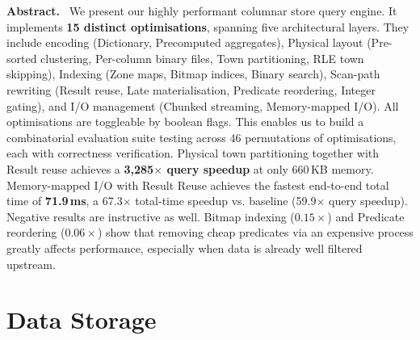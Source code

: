 \documentclass[11pt,a4paper]{article}
\begin{document}
\setcounter{page}{1}

\noindent\textbf{Abstract.}~%
We present our highly performant columnar store query engine.
It implements \textbf{15 distinct optimisations}, spanning five architectural layers.
They include encoding (Dictionary, Precomputed aggregates), Physical layout (Pre-sorted clustering, Per-column binary files, Town partitioning, RLE town skipping), Indexing (Zone maps, Bitmap indices, Binary search), Scan-path rewriting (Result reuse, Late materialisation, Predicate reordering, Integer gating), and I/O management (Chunked streaming, Memory-mapped I/O).
All optimisations are toggleable by boolean flags.
This enables us to build a combinatorial evaluation suite testing across 46 permutations of optimisations, each with correctness verification.
Physical town partitioning together with Result reuse achieves a \textbf{3,285$\times$ query speedup} at only 660\,KB memory.
Memory-mapped I/O with Result Reuse achieves the fastest end-to-end total time of \textbf{71.9\,ms}, a 67.3$\times$ total-time speedup vs. baseline (59.9$\times$ query speedup).
Negative results are instructive as well.
Bitmap indexing ($0.15\times$) and Predicate reordering ($0.06\times$) show that removing cheap predicates via an expensive process greatly affects performance, especially when data is already well filtered upstream.

\section{Data Storage}\label{sec:storage}
\end{document}
